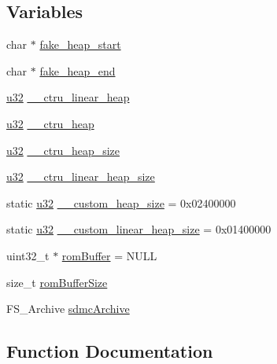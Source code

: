\subsection*{Variables}
\begin{DoxyCompactItemize}
\item 
char $\ast$ \mbox{\hyperlink{ctru-heap_8c_a47629fa15ee658326bbb2252b549d4d7}{fake\+\_\+heap\+\_\+start}}
\item 
char $\ast$ \mbox{\hyperlink{ctru-heap_8c_ae4b1e133be8fac2c0ba1be9534186d01}{fake\+\_\+heap\+\_\+end}}
\item 
\mbox{\hyperlink{sqlite3_8c_a03ad5adfaeb9b7640dde78a0cc390319}{u32}} \mbox{\hyperlink{ctru-heap_8c_aa8a3e331aef7d0734d8a8bb4fad1c94e}{\+\_\+\+\_\+ctru\+\_\+linear\+\_\+heap}}
\item 
\mbox{\hyperlink{sqlite3_8c_a03ad5adfaeb9b7640dde78a0cc390319}{u32}} \mbox{\hyperlink{ctru-heap_8c_aeefa57d10efe46c71a4c1588782af65d}{\+\_\+\+\_\+ctru\+\_\+heap}}
\item 
\mbox{\hyperlink{sqlite3_8c_a03ad5adfaeb9b7640dde78a0cc390319}{u32}} \mbox{\hyperlink{ctru-heap_8c_a52a56c958076252d270d51320c8ca1b3}{\+\_\+\+\_\+ctru\+\_\+heap\+\_\+size}}
\item 
\mbox{\hyperlink{sqlite3_8c_a03ad5adfaeb9b7640dde78a0cc390319}{u32}} \mbox{\hyperlink{ctru-heap_8c_a87d297cc9abe017f33d43674e7d4cf27}{\+\_\+\+\_\+ctru\+\_\+linear\+\_\+heap\+\_\+size}}
\item 
static \mbox{\hyperlink{sqlite3_8c_a03ad5adfaeb9b7640dde78a0cc390319}{u32}} \mbox{\hyperlink{ctru-heap_8c_af7ad1e33ebf16c4f6b8e4844d99f0745}{\+\_\+\+\_\+custom\+\_\+heap\+\_\+size}} = 0x02400000
\item 
static \mbox{\hyperlink{sqlite3_8c_a03ad5adfaeb9b7640dde78a0cc390319}{u32}} \mbox{\hyperlink{ctru-heap_8c_a6514ba886e2b1c03775e2e3be12feac2}{\+\_\+\+\_\+custom\+\_\+linear\+\_\+heap\+\_\+size}} = 0x01400000
\item 
uint32\+\_\+t $\ast$ \mbox{\hyperlink{ctru-heap_8c_a9ddc2aeb88953349f8df5508a2d0409e}{rom\+Buffer}} = N\+U\+LL
\item 
size\+\_\+t \mbox{\hyperlink{ctru-heap_8c_ac8c80ae05c56d2d34b4029e3abde405a}{rom\+Buffer\+Size}}
\item 
F\+S\+\_\+\+Archive \mbox{\hyperlink{ctru-heap_8c_af77e6a8d0ef6f2844371e6b86afcfa0e}{sdmc\+Archive}}
\end{DoxyCompactItemize}


\subsection{Function Documentation}
\mbox{\label{ctru-heap_8c_a014ed46e4e8f30997f14a0cf77e145a3}} 
